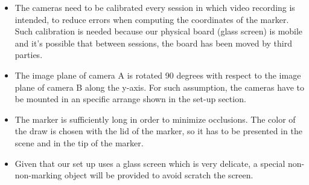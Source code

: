 \documentclass[a4paper,12pt]{article}
\begin{document}
\begin{itemize}
\item The cameras need to be calibrated every session in which video recording is intended, to reduce errors when computing the coordinates of the marker. Such calibration is needed because our physical board (glass screen) is mobile and it's possible that between sessions, the board has been moved by third parties.
\item The image plane of camera A is rotated 90 degrees with respect to the image plane of camera B along the y-axis. For such assumption, the cameras have to be mounted in an specific arrange shown in the set-up section.
\item The marker is sufficiently long in order to minimize occlusions. The color of the draw is chosen with the lid of the marker, so it has to be presented in the scene and in the tip of the marker.
\item Given that our set up uses a glass screen which is very delicate, a special non-non-marking object will be provided to avoid scratch the screen.
\end{itemize}

\end{document}
